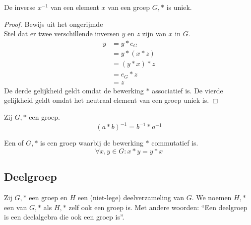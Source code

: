 \documentclass[main.tex]{subfiles}
\begin{document}
\begin{st}
  \label{st:groep-uniek-invers-element}
  De inverse $x^{-1}$ van een element $x$ van een groep $G,*$ is uniek.
  
  \begin{proof}
    Bewijs uit het ongerijmde\\
    Stel dat er twee verschillende inversen $y$ en $z$ zijn van $x$ in $G$.
    \[  
    \begin{array}{rl}
      y &= y * e_{G}\\
        &= y * (x * z)\\
        &= (y * x) * z\\
        &= e_{G} * z\\
        &= z
    \end{array}
    \]
    De derde gelijkheid geldt omdat de bewerking $*$ associatief is. De vierde gelijkheid geldt omdat het neutraal element van een groep uniek is.
  \end{proof}
\end{st}

\begin{st}
  Zij $G,*$ een groep.
  \[ (a*b)^{-1} = b^{-1} * a^{-1} \]
\end{st}

\begin{de}
  Een  of  $G,*$ is een groep waarbij de bewerking $*$ commutatief is.
  \[ \forall x,y \in G: x * y = y * x\]
\end{de}

\subsection{Deelgroep}
\label{sec:deelgroep}

\begin{de}
  Zij $G,*$ een groep en $H$ een (niet-lege) deelverzameling van $G$. We noemen $H,*$ een  van $G,*$ als $H,*$ zelf ook een groep is.
  Met andere woorden: ``Een deelgroep is een deelalgebra die ook een groep is''.
\end{de}
\end{document}
